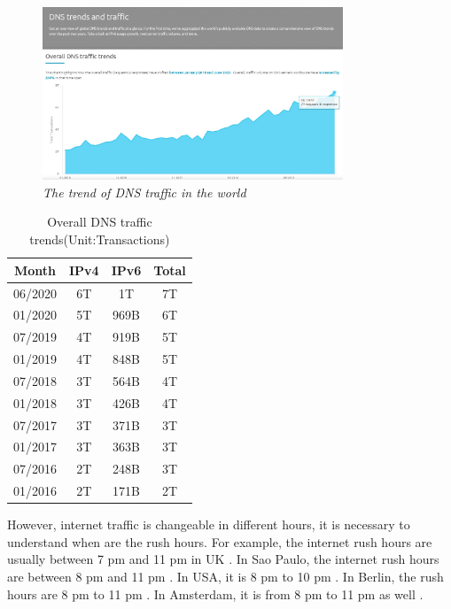 \begin{figure}[hbt!]  
    \centering
    \includegraphics[width=0.8\textwidth]{figure/Overall DNS traffic trends.jpg}
    \caption{\em The trend of DNS traffic in the world \cite{overall_DNS_traffic_trends} \label{fig:trend_DNS_traffic}}
\end{figure}

\begin{table}[hbt!]
    \centering
    \begin{tabular}{|c|c|c|c|}
        \hline
         Month & IPv4 & IPv6 & Total\\
        \hline
         06/2020 & 6T & 1T & 7T \\
        \hline
        01/2020 & 5T & 969B & 6T\\
        \hline
        07/2019 & 4T & 919B & 5T \\
        \hline
        01/2019 & 4T & 848B & 5T \\
        \hline
        07/2018 & 3T & 564B & 4T \\
        \hline
        01/2018 & 3T & 426B & 4T \\
        \hline
        07/2017 & 3T & 371B & 3T \\
        \hline
        01/2017 & 3T & 363B & 3T \\
        \hline
        07/2016 & 2T & 248B & 3T \\
        \hline
        01/2016 & 2T & 171B & 2T \\
        \hline
    \end{tabular}
    \caption{Overall DNS traffic trends(Unit:Transactions) \cite{overall_DNS_traffic_trends}}
    \label{tab:DNS_traffic_trends}
\end{table}

However, internet traffic is changeable in different hours, it is necessary to understand when are the rush hours. For example, the internet rush hours are usually between 7 pm and 11 pm in UK \cite{Avoiding_the_internet_rush_hour}. In Sao Paulo, the internet rush hours are between 8 pm and 11 pm \cite{Brazil_internet_rush_hour}. In USA, it is 8 pm to 10 pm \cite{Measuring_broadband_america}. In Berlin, the rush hours are 8 pm to 11 pm \cite{Berlin_internet_traffic}. In Amsterdam, it is from 8 pm to 11 pm as well \cite{Amsterdam_internet_traffic}.
\\

